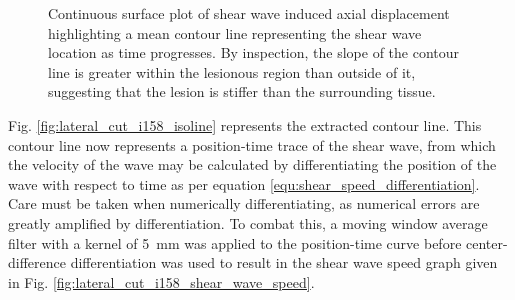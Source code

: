 			\begin{figure}[!t]
				\centering
				\caption[Sample continuous surface plot of shear wave induced axial displacement highlighting the shear wave location in time]{Continuous surface plot of shear wave induced axial displacement highlighting a mean contour line representing the shear wave location as time progresses. By inspection, the slope of the contour line is greater within the lesionous region than outside of it, suggesting that the lesion is stiffer than the surrounding tissue.}
				\label{fig:lateral_cut_i158_imgsc_isoline}
			\end{figure}

			Fig. \ref{fig:lateral_cut_i158_isoline} represents the extracted contour line. This contour line now represents a position-time trace of the shear wave, from which the velocity of the wave may be calculated by differentiating the position of the wave with respect to time as per equation \ref{equ:shear_speed_differentiation}. Care must be taken when numerically differentiating, as numerical errors are greatly amplified by differentiation. To combat this, a moving window average filter with a kernel of \SI{5}{\mm} was applied to the position-time curve before center-difference differentiation was used to result in the shear wave speed graph given in Fig. \ref{fig:lateral_cut_i158_shear_wave_speed}.

